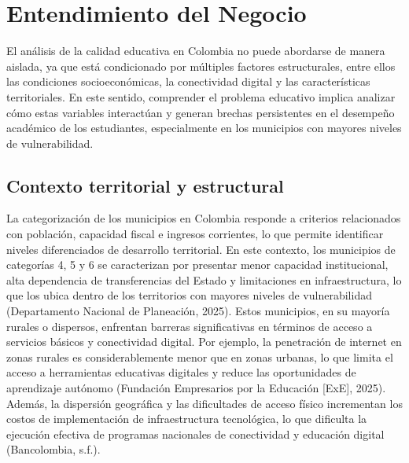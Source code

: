 \section{Entendimiento del Negocio}
El análisis de la calidad educativa en Colombia no puede abordarse de manera aislada, ya que está condicionado por múltiples factores estructurales, entre ellos las condiciones socioeconómicas, la conectividad digital y las características territoriales. En este sentido, comprender el problema educativo implica analizar cómo estas variables interactúan y generan brechas persistentes en el desempeño académico de los estudiantes, especialmente en los municipios con mayores niveles de vulnerabilidad.
\subsection{Contexto territorial y estructural}
La categorización de los municipios en Colombia responde a criterios relacionados con población, capacidad fiscal e ingresos corrientes, lo que permite identificar niveles diferenciados de desarrollo territorial. En este contexto, los municipios de categorías 4, 5 y 6 se caracterizan por presentar menor capacidad institucional, alta dependencia de transferencias del Estado y limitaciones en infraestructura, lo que los ubica dentro de los territorios con mayores niveles de vulnerabilidad (Departamento Nacional de Planeación, 2025).
Estos municipios, en su mayoría rurales o dispersos, enfrentan barreras significativas en términos de acceso a servicios básicos y conectividad digital. Por ejemplo, la penetración de internet en zonas rurales es considerablemente menor que en zonas urbanas, lo que limita el acceso a herramientas educativas digitales y reduce las oportunidades de aprendizaje autónomo (Fundación Empresarios por la Educación [ExE], 2025).
Además, la dispersión geográfica y las dificultades de acceso físico incrementan los costos de implementación de infraestructura tecnológica, lo que dificulta la ejecución efectiva de programas nacionales de conectividad y educación digital (Bancolombia, s.f.).

